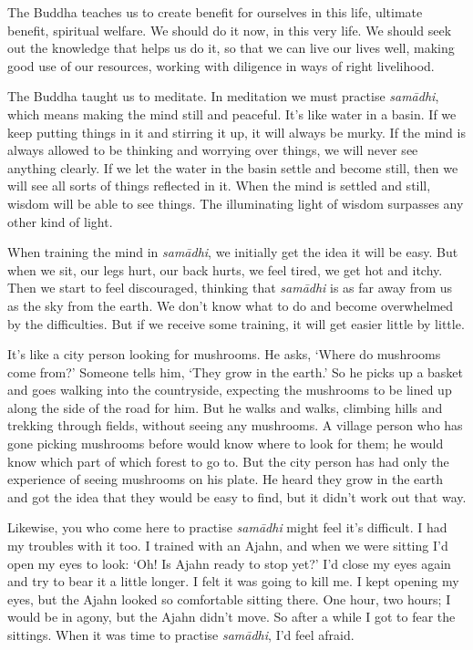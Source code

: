 The Buddha teaches us to create benefit for ourselves in this life, 
ultimate benefit, spiritual welfare. We should do it now, in this very
life. We should seek out the knowledge that helps us do it, so that we
can live our lives well, making good use of our resources, working with
diligence in ways of right livelihood. 

The Buddha taught us to meditate. In meditation we must practise
\emph{samādhi}, which means making the mind still and peaceful. It's
like water in a basin. If we keep putting things in it and stirring it
up, it will always be murky. If the mind is always allowed to be
thinking and worrying over things, we will never see anything clearly. 
If we let the water in the basin settle and become still, then we will
see all sorts of things reflected in it. When the mind is settled and
still, wisdom will be able to see things. The illuminating light of
wisdom surpasses any other kind of light. 

When training the mind in \emph{samādhi}, we initially get the idea it
will be easy. But when we sit, our legs hurt, our back hurts, we feel
tired, we get hot and itchy. Then we start to feel discouraged, thinking
that \emph{samādhi} is as far away from us as the sky from the earth. We
don't know what to do and become overwhelmed by the difficulties. But if
we receive some training, it will get easier little by little. 

It's like a city person looking for mushrooms. He asks, `Where do
mushrooms come from?' Someone tells him, `They grow in the earth.' So he
picks up a basket and goes walking into the countryside, expecting the
mushrooms to be lined up along the side of the road for him. But he
walks and walks, climbing hills and trekking through fields, without
seeing any mushrooms. A village person who has gone picking mushrooms
before would know where to look for them; he would know which part of
which forest to go to. But the city person has had only the experience
of seeing mushrooms on his plate. He heard they grow in the earth and
got the idea that they would be easy to find, but it didn't work out
that way. 

Likewise, you who come here to practise \emph{samādhi} might feel it's
difficult. I had my troubles with it too. I trained with an Ajahn, and
when we were sitting I'd open my eyes to look: `Oh! Is Ajahn ready to
stop yet?' I'd close my eyes again and try to bear it a little longer. I
felt it was going to kill me. I kept opening my eyes, but the Ajahn
looked so comfortable sitting there. One hour, two hours; I would be in
agony, but the Ajahn didn't move. So after a while I got to fear the
sittings. When it was time to practise \emph{samādhi}, I'd feel afraid. 

